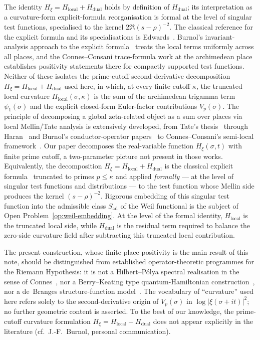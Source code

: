 \documentclass[11pt]{article}
\newcommand{\Hxi}{H_{\xi}}
\newcommand{\Hlocal}{H_{\mathrm{local}}}
\newcommand{\Hdual}{H_{\mathrm{dual}}}
\newcommand{\Sad}{S_{\mathrm{ad}}}
\begin{document}
The identity
$\Hxi=\Hlocal+\Hdual$ holds by definition of $\Hdual$; its
interpretation as a curvature-form explicit-formula
reorganisation is formal at the level of singular test
functions, specialised to the kernel $2\Re(s-\rho)^{-2}$.
The classical reference for the explicit formula and its
specialisations is Edwards~\cite{Edwards}.
Burnol's invariant-analysis approach to the explicit
formula~\cite{Burnol} treats the local terms uniformly across
all places, and the Connes--Consani trace-formula work at the
archimedean place~\cite{ConnesConsani} establishes positivity
statements there for compactly supported test functions.
Neither of these isolates the prime-cutoff second-derivative
decomposition $\Hxi=\Hlocal+\Hdual$ used here, in which, at
every finite cutoff $\kappa$, the truncated local curvature
$\Hlocal(\sigma,\kappa)$ is the sum of the archimedean
trigamma term $\psi_1(\sigma)$ and the explicit closed-form
Euler-factor contributions $V_p(\sigma)$.
The principle of decomposing a global zeta-related
object as a sum over places via local Mellin/Tate
analysis is extensively developed, from Tate's
thesis~\cite{Tate1967} through Haran~\cite{Haran90}
and Burnol's conductor-operator
papers~\cite{Burnol} to Connes--Consani's
semi-local framework~\cite{ConnesConsani}. Our
paper decomposes the real-variable function
$\Hxi(\sigma,t)$ with finite prime cutoff, a
two-parameter picture not present in those works.
Equivalently, the decomposition $\Hxi=\Hlocal+\Hdual$ is the
classical explicit formula~\cite{Edwards} truncated to primes
$p\le\kappa$ and applied \emph{formally} --- at the level of
singular test functions and distributions --- to the test
function whose Mellin side produces the kernel $(s-\rho)^{-2}$.
Rigorous embedding of this singular test function into the
admissible class $\Sad$ of the Weil functional is the subject
of Open Problem~\ref{op:weil-embedding}.
At the level of the formal identity, $\Hlocal$ is the
truncated local side, while $\Hdual$ is the residual term
required to balance the zero-side curvature field after
subtracting this truncated local contribution.

The present construction, whose finite-place positivity is
the main result of this note, should be distinguished from
established operator-theoretic programmes for the Riemann
Hypothesis: it is not a Hilbert--P\'olya spectral realisation
in the sense of Connes~\cite{Connes}, nor a Berry--Keating
type quantum-Hamiltonian
construction~\cite{BerryKeating1999}, nor a de~Branges
structure-function model~\cite{deBranges,deBranges1986}.
The vocabulary of ``curvature'' used here refers solely to the
second-derivative origin of $V_p(\sigma)$ in
$\log\lvert\xi(\sigma+it)\rvert^{2}$; no further geometric
content is asserted.
To the best of our knowledge, the prime-cutoff curvature
formulation $\Hxi=\Hlocal+\Hdual$ does not appear explicitly
in the literature (cf.\ J.-F.~Burnol, personal communication).
\end{document}
